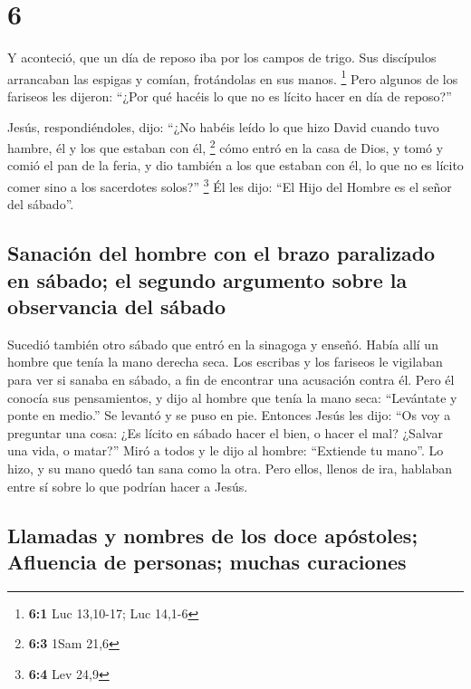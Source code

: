 \hypertarget{section-5}{%
\section{6}\label{section-5}}

 Y aconteció, que un día de reposo iba por los campos de
trigo. Sus discípulos arrancaban las espigas y comían, frotándolas en
sus manos. \footnote{\textbf{6:1} Luc 13,10-17; Luc 14,1-6}
 Pero algunos de los fariseos les dijeron: ``¿Por qué
hacéis lo que no es lícito hacer en día de reposo?''

 Jesús, respondiéndoles, dijo: ``¿No habéis leído lo que
hizo David cuando tuvo hambre, él y los que estaban con él, \footnote{\textbf{6:3}
  1Sam 21,6}  cómo entró en la casa de Dios, y tomó y
comió el pan de la feria, y dio también a los que estaban con él, lo que
no es lícito comer sino a los sacerdotes solos?'' \footnote{\textbf{6:4}
  Lev 24,9}  Él les dijo: ``El Hijo del Hombre es el señor
del sábado''.

\hypertarget{sanaciuxf3n-del-hombre-con-el-brazo-paralizado-en-suxe1bado-el-segundo-argumento-sobre-la-observancia-del-suxe1bado}{%
\subsection{Sanación del hombre con el brazo paralizado en sábado; el
segundo argumento sobre la observancia del
sábado}\label{sanaciuxf3n-del-hombre-con-el-brazo-paralizado-en-suxe1bado-el-segundo-argumento-sobre-la-observancia-del-suxe1bado}}

 Sucedió también otro sábado que entró en la sinagoga y
enseñó. Había allí un hombre que tenía la mano derecha seca.
 Los escribas y los fariseos le vigilaban para ver si
sanaba en sábado, a fin de encontrar una acusación contra él.
 Pero él conocía sus pensamientos, y dijo al hombre que
tenía la mano seca: ``Levántate y ponte en medio.'' Se levantó y se puso
en pie.  Entonces Jesús les dijo: ``Os voy a preguntar una
cosa: ¿Es lícito en sábado hacer el bien, o hacer el mal? ¿Salvar una
vida, o matar?''  Miró a todos y le dijo al hombre:
``Extiende tu mano''. Lo hizo, y su mano quedó tan sana como la otra.
 Pero ellos, llenos de ira, hablaban entre sí sobre lo
que podrían hacer a Jesús.

\hypertarget{llamadas-y-nombres-de-los-doce-apuxf3stoles-afluencia-de-personas-muchas-curaciones}{%
\subsection{Llamadas y nombres de los doce apóstoles; Afluencia de
personas; muchas
curaciones}\label{llamadas-y-nombres-de-los-doce-apuxf3stoles-afluencia-de-personas-muchas-curaciones}}

